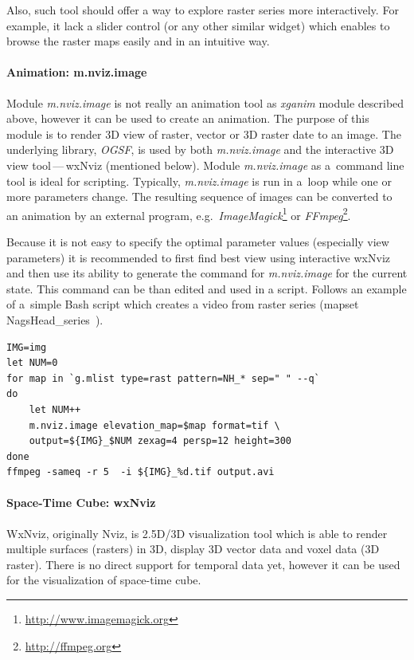 \documentclass[a4paper,12pt,oneside]{book}
\newcommand{\module}[1]{\textsl{#1}}
\newcommand{\dash}{\mbox{\,---\,}}
\begin{document}
Also, such tool should offer a way to explore raster series more interactively.
For example, it lack a slider control (or any other similar widget)
which enables to browse the raster maps easily and in an intuitive way.


\paragraph{Animation: m.nviz.image}
Module \module{m.nviz.image} is not really an animation tool as \module{xganim} module described above,
however it can be used to create an animation.
The purpose of this module is to render 3D view of raster, vector or 3D raster date to an image.
The underlying library, \emph{OGSF}, is used by both \module{m.nviz.image}
and the interactive 3D view tool\dash wxNviz (mentioned below).
Module \module{m.nviz.image} as a~command line tool is ideal for scripting.
Typically, \module{m.nviz.image} is run in a~loop while one or more parameters change.
The resulting sequence of images can be converted to an animation by an external program,
e.g.\ \emph{ImageMagick}\footnote{\url{http://www.imagemagick.org}} or
\emph{FFmpeg}\footnote{\url{http://ffmpeg.org}}.

Because it is not easy to specify the optimal parameter values
(especially view parameters) it is recommended to first find best view using interactive
wxNviz and then use its ability to generate the command for \module{m.nviz.image} for the current state.
This command can be than edited and used in a script.
Follows an example of a~simple Bash script which creates a video from raster series
(mapset NagsHead\_series~\cite{nagshead}).

\bigskip
\begin{small}
\begin{lstlisting}[style=mybash]
IMG=img
let NUM=0
for map in `g.mlist type=rast pattern=NH_* sep=" " --q`
do
    let NUM++
    m.nviz.image elevation_map=$map format=tif \
    output=${IMG}_$NUM zexag=4 persp=12 height=300
done
ffmpeg -sameq -r 5  -i ${IMG}_%d.tif output.avi
\end{lstlisting}
\end{small}



\paragraph{Space-Time Cube: wxNviz}
WxNviz, originally Nviz, is 2.5D/3D visualization tool which is able to render
multiple surfaces (rasters) in 3D, display 3D vector data and voxel data (3D raster).
There is no direct support for temporal data yet, however it can be 
used for the visualization of space-time cube.
\end{document}
